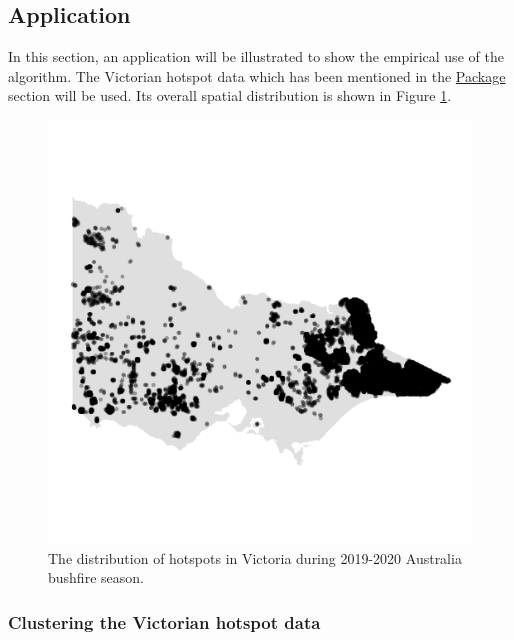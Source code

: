 \hypertarget{application}{%
\subsection{Application}\label{application}}

In this section, an application will be illustrated to show the
empirical use of the algorithm. The Victorian hotspot data which has
been mentioned in the \protect\hyperlink{package}{Package} section will
be used. Its overall spatial distribution is shown in Figure
\ref{fig:hotspots}.

\begin{Schunk}
\begin{figure}

{\centering \includegraphics[width=0.8\linewidth]{figures/before_clustering} 

}

\caption[The distribution of hotspots in Victoria during 2019-2020 Australia bushfire season]{The distribution of hotspots in Victoria during 2019-2020 Australia bushfire season.}\label{fig:hotspots}
\end{figure}
\end{Schunk}

\hypertarget{clustering-the-victorian-hotspot-data}{%
\subsubsection{Clustering the Victorian hotspot
data}\label{clustering-the-victorian-hotspot-data}}

